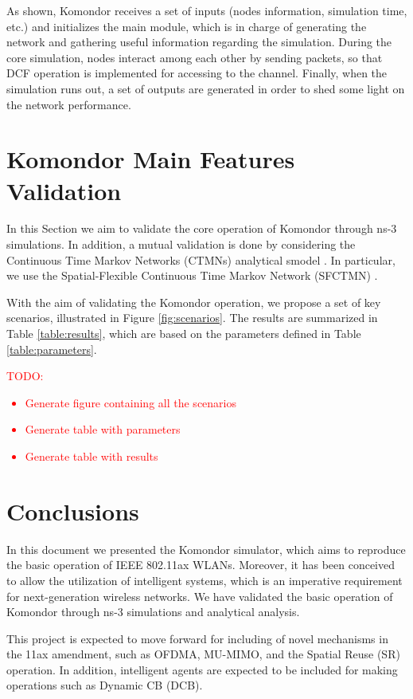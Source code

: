 \documentclass[a4paper]{article}
\begin{document}
As shown, Komondor receives a set of inputs (nodes information, simulation time, etc.) and initializes the main module, which is in charge of generating the network and gathering useful information regarding the simulation. During the core simulation, nodes interact among each other by sending packets, so that DCF operation is implemented for accessing to the channel. Finally, when the simulation runs out, a set of outputs are generated in order to shed some light on the network performance.

\section{Komondor Main Features Validation}
\label{section:validations}
	In this Section we aim to validate the core operation of Komondor through ns-3 simulations. In addition, a mutual validation is done by considering the Continuous Time Markov Networks (CTMNs) analytical smodel \cite{bellalta2014throughput}. In particular, we use the Spatial-Flexible Continuous Time Markov Network (SFCTMN) \cite{barrachina2018performance}.
	
	With the aim of validating the Komondor operation, we propose a set of key scenarios, illustrated in Figure \ref{fig:scenarios}. The results are summarized in Table \ref{table:results}, which are based on the parameters defined in Table \ref{table:parameters}. 
		 
	\textcolor{red}{TODO:\begin{itemize}
			\item Generate figure containing all the scenarios
			\item Generate table with parameters 
			\item Generate table with results
	\end{itemize}}

\section{Conclusions}
\label{section:conclusions}
In this document we presented the Komondor simulator, which aims to reproduce the basic operation of IEEE 802.11ax WLANs. Moreover, it has been conceived to allow the utilization of intelligent systems, which is an imperative requirement for next-generation wireless networks. We have validated the basic operation of Komondor through ns-3 simulations and analytical analysis.

This project is expected to move forward for including of novel mechanisms in the 11ax amendment, such as OFDMA, MU-MIMO, and the Spatial Reuse (SR) operation. In addition, intelligent agents are expected to be included for making operations such as Dynamic CB (DCB).



\end{document}
